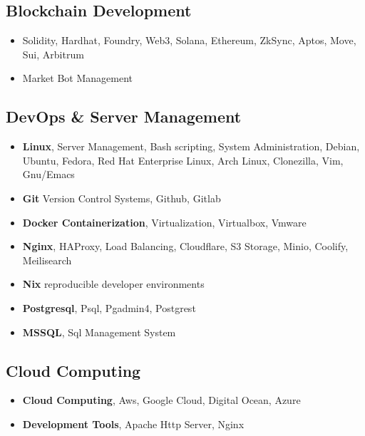 \documentclass[line,margin]{res}
\begin{document}
\begin{resume}
                 \subsection{Blockchain Development}
                 \begin{itemize}  \itemsep -2pt %
                        \item Solidity, Hardhat, Foundry, Web3, Solana, Ethereum, ZkSync, Aptos, Move, Sui, Arbitrum
                        \item Market Bot Management 
                 \end{itemize}
                 \subsection{DevOps \& Server Management}
                 \begin{itemize}  \itemsep -2pt %
                   \item \textbf{Linux}, Server Management, Bash scripting, System Administration, Debian, Ubuntu, Fedora, Red Hat Enterprise Linux, Arch Linux, Clonezilla, Vim, Gnu/Emacs
                   \item \textbf{Git} Version Control Systems, Github, Gitlab
                   \item \textbf{Docker Containerization}, Virtualization, Virtualbox, Vmware
                   \item \textbf{Nginx}, HAProxy, Load Balancing, Cloudflare, S3 Storage, Minio, Coolify, Meilisearch
                   \item \textbf{Nix} reproducible developer environments
                   \item \textbf{Postgresql}, Psql, Pgadmin4, Postgrest 
                   \item \textbf{MSSQL}, Sql Management System 
                 \end{itemize}
                 \subsection{Cloud Computing}
                 \begin{itemize}  \itemsep -2pt %
                   \item \textbf{Cloud Computing}, Aws, Google Cloud, Digital Ocean, Azure
                   \item \textbf{Development Tools}, Apache Http Server, Nginx 
                 \end{itemize}

\end{resume}
\end{document}
